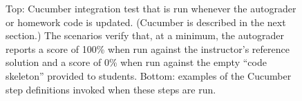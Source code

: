 
\begin{figure}
  \centering
  \caption{\label{fig:rag-ci}%
  Top: Cucumber integration test that is run whenever the autograder or
  homework code is updated.  (Cucumber is described in the next
  section.)
  The scenarios verify that, at a minimum,
  the autograder reports a score of 100\% when run against the
  instructor's reference solution and a score of 0\% when run against
  the empty ``code skeleton'' provided to students.  
  Bottom: examples of the Cucumber step definitions invoked when these
  steps are run.
}
\end{figure}

